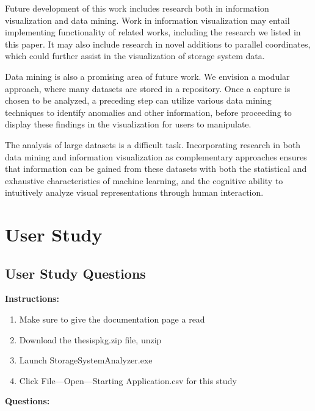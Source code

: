 \documentclass[12pt]{ucthesis}
\begin{document}
Future development of this work includes research both in information visualization and data mining. Work in information visualization may entail implementing functionality of related works, including the research we listed in this paper. It may also include research in novel additions to parallel coordinates, which could further assist in the visualization of storage system data.

Data mining is also a promising area of future work. We envision a modular approach, where many datasets are stored in a repository. Once a capture is chosen to be analyzed, a preceding step can utilize various data mining techniques to identify anomalies and other information, before proceeding to display these findings in the visualization for users to manipulate.

The analysis of large datasets is a difficult task. Incorporating research in both data mining and information visualization as complementary approaches ensures that information can be gained from these datasets with both the statistical and exhaustive characteristics of machine learning, and the cognitive ability to intuitively analyze visual representations through human interaction.


\clearpage



\appendix 
\chapter{User Study} 
\label{app:user_study}
\section{User Study Questions}
\label{questions}
\textbf{Instructions:}
\begin{enumerate}
\item Make sure to give the documentation page a read
\item Download the thesispkg.zip file, unzip
\item Launch StorageSystemAnalyzer.exe
\item Click File---Open---Starting Application.csv for this study
\end{enumerate}

\textbf{Questions:}
\end{document}
